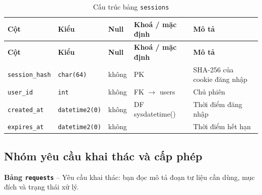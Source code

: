 \setlength{\tabcolsep}{4pt}
\begin{longtable}{>{\raggedright\arraybackslash}p{}>{\raggedright\arraybackslash}p{}>{\centering\arraybackslash}p{}>{\raggedright\arraybackslash}p{}>{\raggedright\arraybackslash}p{}}
\caption{Cấu trúc bảng \texttt{sessions}}\label{tab:col_sessions}\\
\toprule \textbf{Cột} & \textbf{Kiểu} & \textbf{Null} & \textbf{Khoá / mặc định} & \textbf{Mô tả} \\ \midrule \endfirsthead
\toprule \textbf{Cột} & \textbf{Kiểu} & \textbf{Null} & \textbf{Khoá / mặc định} & \textbf{Mô tả} \\ \midrule \endhead
\bottomrule \endfoot
\texttt{session\_hash} & {\footnotesize\texttt{char(64)}} & không & PK & SHA-256 của cookie đăng nhập \\
\texttt{user\_id} & {\footnotesize\texttt{int}} & không & FK $\rightarrow$ users & Chủ phiên \\
\texttt{created\_at} & {\footnotesize\texttt{datetime2(0)}} & không & DF sysdatetime() & Thời điểm đăng nhập \\
\texttt{expires\_at} & {\footnotesize\texttt{datetime2(0)}} & không &  & Thời điểm hết hạn \\
\end{longtable}

\subsection{Nhóm yêu cầu khai thác và cấp phép}

\textbf{Bảng \texttt{requests}} -- Yêu cầu khai thác: bạn đọc mô tả đoạn tư liệu cần dùng, mục đích và trạng thái xử lý.

